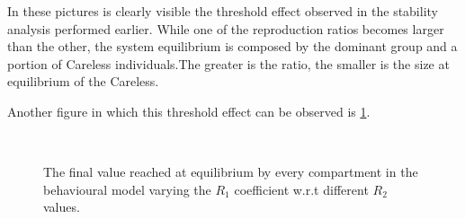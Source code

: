 In these pictures is clearly visible the threshold effect observed in the stability analysis performed earlier. While one of the reproduction ratios becomes larger than the other, the system equilibrium is composed by the dominant group and a portion of Careless individuals.The greater is the ratio, the  smaller is the size at equilibrium of the Careless. 

Another figure in which this threshold effect can be observed is \ref{fig:subfig_sensitivity_behavioural_r1}.

\begin{figure}[h]
	\centering
	 \quad
	 \\
	\caption[Final Behavioural compartments varying $R_1$]{The final value reached at equilibrium by every compartment in the behavioural model varying the $R_1$ coefficient w.r.t different $R_2$ values.}
	\label{fig:subfig_sensitivity_behavioural_r1}
\end{figure}
